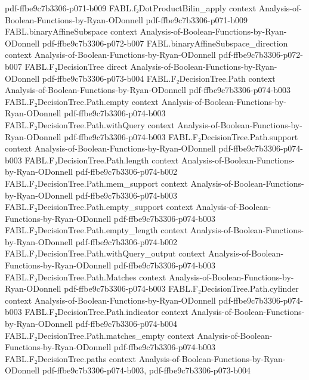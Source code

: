 \begin{theorem}
  {pdf-ffbe9c7b3306-p071-b009}
\proofstep
  {FABL.f₂DotProductBilin_apply}
  {context}
  {Analysis-of-Boolean-Functions-by-Ryan-ODonnell}
  {pdf-ffbe9c7b3306-p071-b009}
\proofstep
  {FABL.binaryAffineSubspace}
  {context}
  {Analysis-of-Boolean-Functions-by-Ryan-ODonnell}
  {pdf-ffbe9c7b3306-p072-b007}
\proofstep
  {FABL.binaryAffineSubspace_direction}
  {context}
  {Analysis-of-Boolean-Functions-by-Ryan-ODonnell}
  {pdf-ffbe9c7b3306-p072-b007}
\proofstep
  {FABL.F₂DecisionTree}
  {direct}
  {Analysis-of-Boolean-Functions-by-Ryan-ODonnell}
  {pdf-ffbe9c7b3306-p073-b004}
\proofstep
  {FABL.F₂DecisionTree.Path}
  {context}
  {Analysis-of-Boolean-Functions-by-Ryan-ODonnell}
  {pdf-ffbe9c7b3306-p074-b003}
\proofstep
  {FABL.F₂DecisionTree.Path.empty}
  {context}
  {Analysis-of-Boolean-Functions-by-Ryan-ODonnell}
  {pdf-ffbe9c7b3306-p074-b003}
\proofstep
  {FABL.F₂DecisionTree.Path.withQuery}
  {context}
  {Analysis-of-Boolean-Functions-by-Ryan-ODonnell}
  {pdf-ffbe9c7b3306-p074-b003}
\proofstep
  {FABL.F₂DecisionTree.Path.support}
  {context}
  {Analysis-of-Boolean-Functions-by-Ryan-ODonnell}
  {pdf-ffbe9c7b3306-p074-b003}
\proofstep
  {FABL.F₂DecisionTree.Path.length}
  {context}
  {Analysis-of-Boolean-Functions-by-Ryan-ODonnell}
  {pdf-ffbe9c7b3306-p074-b002}
\proofstep
  {FABL.F₂DecisionTree.Path.mem_support}
  {context}
  {Analysis-of-Boolean-Functions-by-Ryan-ODonnell}
  {pdf-ffbe9c7b3306-p074-b003}
\proofstep
  {FABL.F₂DecisionTree.Path.empty_support}
  {context}
  {Analysis-of-Boolean-Functions-by-Ryan-ODonnell}
  {pdf-ffbe9c7b3306-p074-b003}
\proofstep
  {FABL.F₂DecisionTree.Path.empty_length}
  {context}
  {Analysis-of-Boolean-Functions-by-Ryan-ODonnell}
  {pdf-ffbe9c7b3306-p074-b002}
\proofstep
  {FABL.F₂DecisionTree.Path.withQuery_output}
  {context}
  {Analysis-of-Boolean-Functions-by-Ryan-ODonnell}
  {pdf-ffbe9c7b3306-p074-b003}
\proofstep
  {FABL.F₂DecisionTree.Path.Matches}
  {context}
  {Analysis-of-Boolean-Functions-by-Ryan-ODonnell}
  {pdf-ffbe9c7b3306-p074-b003}
\proofstep
  {FABL.F₂DecisionTree.Path.cylinder}
  {context}
  {Analysis-of-Boolean-Functions-by-Ryan-ODonnell}
  {pdf-ffbe9c7b3306-p074-b003}
\proofstep
  {FABL.F₂DecisionTree.Path.indicator}
  {context}
  {Analysis-of-Boolean-Functions-by-Ryan-ODonnell}
  {pdf-ffbe9c7b3306-p074-b004}
\proofstep
  {FABL.F₂DecisionTree.Path.matches_empty}
  {context}
  {Analysis-of-Boolean-Functions-by-Ryan-ODonnell}
  {pdf-ffbe9c7b3306-p074-b003}
\proofstep
  {FABL.F₂DecisionTree.paths}
  {context}
  {Analysis-of-Boolean-Functions-by-Ryan-ODonnell}
  {pdf-ffbe9c7b3306-p074-b003,
    pdf-ffbe9c7b3306-p073-b004}

\end{theorem}
